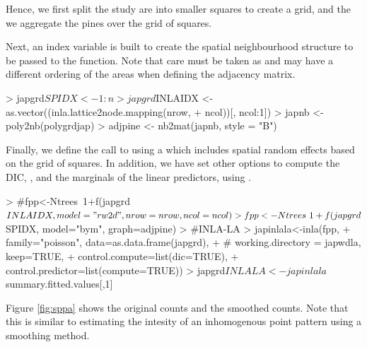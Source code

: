 \documentclass[article]{jss}
\begin{document}
Hence, we first split the study are into smaller squares to create a
grid, and the we aggregate the pines over the grid of squares. 

\begin{Schunk}
\end{Schunk}


Next, an index variable is built to create the spatial neighbourhood structure
to be passed to the  function. Note that care must be taken as
 and  may have a different ordering of the areas when
defining the adjacency matrix.

\begin{Schunk}
\begin{Sinput}
> japgrd$SPIDX <- 1:n
> japgrd$INLAIDX <- as.vector((inla.lattice2node.mapping(nrow, 
+     ncol))[, ncol:1])
> japnb <- poly2nb(polygrdjap)
> adjpine <- nb2mat(japnb, style = "B")
\end{Sinput}
\end{Schunk}

Finally, we define the call to  using a  which
includes spatial random effects based on the grid of squares.  In addition, we
have set other options to compute the DIC,
, and the marginals of the linear
predictors, using .

\begin{Schunk}
\begin{Sinput}
> #fpp<-Ntrees~1+f(japgrd$INLAIDX, model="rw2d",nrow=nrow, ncol=ncol)
> fpp<-Ntrees~1+f(japgrd$SPIDX, model="bym", graph=adjpine)
> #INLA-LA
>    japinlala<-inla(fpp,
+    family="poisson", data=as.data.frame(japgrd),
+ #   working.directory = japwdla, keep=TRUE,
+    control.compute=list(dic=TRUE),
+    control.predictor=list(compute=TRUE))
> japgrd$INLALA<- japinlala$summary.fitted.values[,1]
\end{Sinput}
\end{Schunk}
\noindent
Figure \ref{fig:sppa} shows the original counts and the smoothed counts.  Note
that this is similar to estimating the intesity of an inhomogenous point
pattern using a smoothing method.
\end{document}
